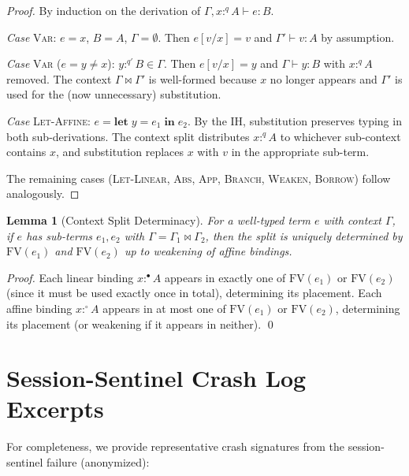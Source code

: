 \documentclass[11pt,a4paper]{article}
\newtheorem{lemma}[theorem]{Lemma}
\newcommand{\letaff}{\mathbf{let}}
\newcommand{\lmark}{\bullet}  %
\newcommand{\amark}{\circ}    %
\newcommand{\ctx}{\Gamma}
\newcommand{\judge}[3]{#1 \vdash #2 : #3}
\begin{document}
\begin{proof}
By induction on the derivation of $\judge{\ctx, x :^q A}{e}{B}$.

\textit{Case} \textsc{Var}: $e = x$, $B = A$, $\ctx = \emptyset$.
Then $e[v/x] = v$ and $\judge{\ctx'}{v}{A}$ by assumption.

\textit{Case} \textsc{Var} ($e = y \neq x$): $y :^{q'} B \in \ctx$.
Then $e[v/x] = y$ and $\judge{\ctx}{y}{B}$ with $x :^q A$ removed.
The context $\ctx \bowtie \ctx'$ is well-formed because $x$ no longer appears
and $\ctx'$ is used for the (now unnecessary) substitution.

\textit{Case} \textsc{Let-Affine}: $e = \letaff\; y = e_1\; \mathbf{in}\; e_2$.
By the IH, substitution preserves typing in both sub-derivations.
The context split distributes $x :^q A$ to whichever sub-context contains $x$,
and substitution replaces $x$ with $v$ in the appropriate sub-term.

The remaining cases (\textsc{Let-Linear}, \textsc{Abs}, \textsc{App},
\textsc{Branch}, \textsc{Weaken}, \textsc{Borrow}) follow analogously.
\end{proof}

\begin{lemma}[Context Split Determinacy]
\label{lem:split-det}
For a well-typed term $e$ with context $\ctx$, if $e$ has sub-terms $e_1, e_2$
with $\ctx = \ctx_1 \bowtie \ctx_2$, then the split is uniquely determined by
$\text{FV}(e_1)$ and $\text{FV}(e_2)$ up to weakening of affine bindings.
\end{lemma}

\begin{proof}
Each linear binding $x :^\lmark A$ appears in exactly one of $\text{FV}(e_1)$
or $\text{FV}(e_2)$ (since it must be used exactly once in total), determining
its placement. Each affine binding $x :^\amark A$ appears in at most one of
$\text{FV}(e_1)$ or $\text{FV}(e_2)$, determining its placement (or weakening
if it appears in neither). \qed
\end{proof}

\section{Session-Sentinel Crash Log Excerpts}
\label{app:crash-logs}

For completeness, we provide representative crash signatures from the
session-sentinel failure (anonymized):
\end{document}
